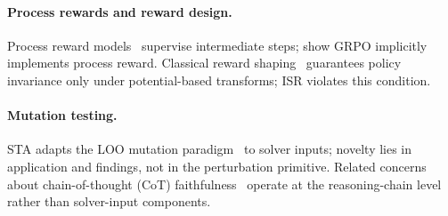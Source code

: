 \paragraph{Process rewards and reward design.}
Process reward models~\citep{lightman-verify-step, setlur2025rewarding, cui2025prime, cobbe2021training, uesato2022solving} supervise intermediate steps; \citet{sullivan2025grpo-prm} show GRPO implicitly implements process reward. Classical reward shaping~\citep{ng1999policy, gao-effective-rl-reward} guarantees policy invariance only under potential-based transforms; ISR violates this condition.

\paragraph{Mutation testing.}
STA adapts the LOO mutation paradigm~\citep{demillo1978, jia-harman-survey} to solver inputs; novelty lies in application and findings, not in the perturbation primitive.
Related concerns about chain-of-thought (CoT) faithfulness~\citep{lanham2023faithfulness, turpin2023unfaithful} operate at the reasoning-chain level rather than solver-input components.
